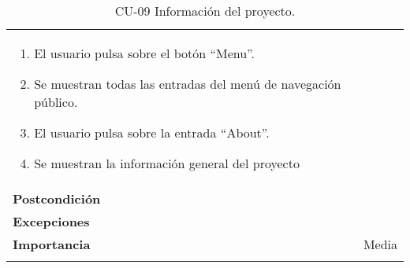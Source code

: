 \begin{longtable}[]{@{}ll@{}}
\begin{minipage}[t]{0.67\columnwidth}
\begin{enumerate}
\def\labelenumi{\arabic{enumi}.}
\tightlist
\item
  El usuario pulsa sobre el botón ``Menu''.
\item
  Se muestran todas las entradas del menú de navegación público.
\item
  El usuario pulsa sobre la entrada ``About''.
\item
  Se muestran la información general del proyecto
\end{enumerate}\strut
\end{minipage}\tabularnewline
\begin{minipage}[t]{0.27\columnwidth}\raggedright
\textbf{Postcondición}\strut
\end{minipage} & \begin{minipage}[t]{0.67\columnwidth}\raggedright
\strut
\end{minipage}\tabularnewline
\begin{minipage}[t]{0.27\columnwidth}\raggedright
\textbf{Excepciones}\strut
\end{minipage} & \begin{minipage}[t]{0.67\columnwidth}\raggedright
\strut
\end{minipage}\tabularnewline
\begin{minipage}[t]{0.27\columnwidth}\raggedright
\textbf{Importancia}\strut
\end{minipage} & \begin{minipage}[t]{0.67\columnwidth}\raggedright
Media\strut
\end{minipage}\tabularnewline
\bottomrule
\caption{CU-09 Información del proyecto.}
\end{longtable}

